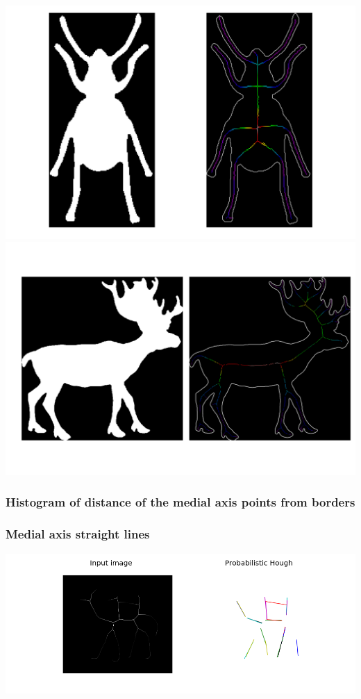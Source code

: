 \documentclass[12pt]{article}
\begin{document}
\includegraphics[scale=0.25]{beetle_281.png}
\includegraphics[scale=0.25]{deer_79.png}

\subsubsection{Histogram of distance of the medial axis points from borders}
\subsubsection{Medial axis straight lines}
\includegraphics[scale=0.6]{camel_764.png}
\vspace{12px}
\end{document}
